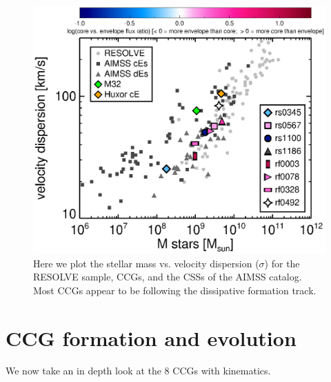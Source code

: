 \documentclass[iop,apj]{emulateapj}
\begin{document}
\begin{figure}[b]
\begin{center}
\includegraphics{faber-jackson_resolvesigmas.eps}
\caption{Here we plot the stellar mass vs. velocity dispersion ($\sigma$) for the RESOLVE sample, CCGs, and the CSSs of the AIMSS catalog. Most CCGs appear to be following the dissipative formation track.}
\label{fig:sigma}
\end{center}
\end{figure}

\section{CCG formation and evolution} %
\label{discussion}

We now take an in depth look at the 8 CCGs with kinematics. 
\end{document}
